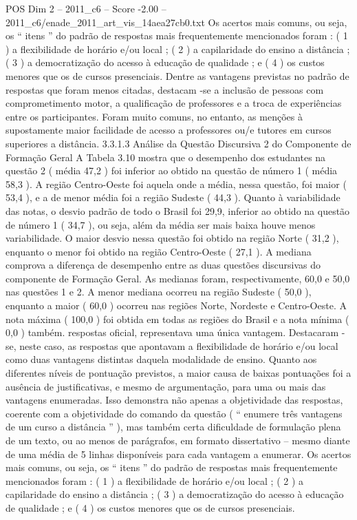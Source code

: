 \begin{textsample}{POS Dim 2 – 2011\_c6 – Score -2.00 – 2011\_c6/enade\_2011\_art\_vis\_14aea27cb0.txt}
Os acertos mais comuns, ou seja, os “ itens ” do padrão de respostas mais frequentemente mencionados foram : ( 1 ) a flexibilidade de horário e/ou local ; ( 2 ) a capilaridade do ensino a distância ; ( 3 ) a democratização do acesso à educação de qualidade ; e ( 4 ) os custos menores que os de cursos presenciais.
Dentre as vantagens previstas no padrão de respostas que foram menos citadas, destacam -se a inclusão de pessoas com comprometimento motor, a qualificação de professores e a troca de experiências entre os participantes.
Foram muito comuns, no entanto, as menções à supostamente maior facilidade de acesso a professores ou/e tutores em cursos superiores a distância. 3.3.1.3 Análise da Questão Discursiva 2 do Componente de Formação Geral A Tabela 3.10 mostra que o desempenho dos estudantes na questão 2 ( média 47,2 ) foi inferior ao obtido na questão de número 1 ( média 58,3 ).
A região Centro-Oeste foi aquela onde a média, nessa questão, foi maior ( 53,4 ), e a de menor média foi a região Sudeste ( 44,3 ).
Quanto à variabilidade das notas, o desvio padrão de todo o Brasil foi 29,9, inferior ao obtido na questão de número 1 ( 34,7 ), ou seja, além da média ser mais baixa houve menos variabilidade.
O maior desvio nessa questão foi obtido na região Norte ( 31,2 ), enquanto o menor foi obtido na região Centro-Oeste ( 27,1 ).
A mediana comprova a diferença de desempenho entre as duas questões discursivas do componente de Formação Geral.
As medianas foram, respectivamente, 60,0 e 50,0 nas questões 1 e 2.
A menor mediana ocorreu na região Sudeste ( 50,0 ), enquanto a maior ( 60,0 ) ocorreu nas regiões Norte, Nordeste e Centro-Oeste.
A nota máxima ( 100,0 ) foi obtida em todas as regiões do Brasil e a nota mínima ( 0,0 ) também. respostas oficial, representava uma única vantagem.
Destacaram -se, neste caso, as respostas que apontavam a flexibilidade de horário e/ou local como duas vantagens distintas daquela modalidade de ensino.
Quanto aos diferentes níveis de pontuação previstos, a maior causa de baixas pontuações foi a ausência de justificativas, e mesmo de argumentação, para uma ou mais das vantagens enumeradas.
Isso demonstra não apenas a objetividade das respostas, coerente com a objetividade do comando da questão ( “ enumere três vantagens de um curso a distância ” ), mas também certa dificuldade de formulação plena de um texto, ou ao menos de parágrafos, em formato dissertativo – mesmo diante de uma média de 5 linhas disponíveis para cada vantagem a enumerar.
Os acertos mais comuns, ou seja, os “ itens ” do padrão de respostas mais frequentemente mencionados foram : ( 1 ) a flexibilidade de horário e/ou local ; ( 2 ) a capilaridade do ensino a distância ; ( 3 ) a democratização do acesso à educação de qualidade ; e ( 4 ) os custos menores que os de cursos presenciais.

\end{textsample}
